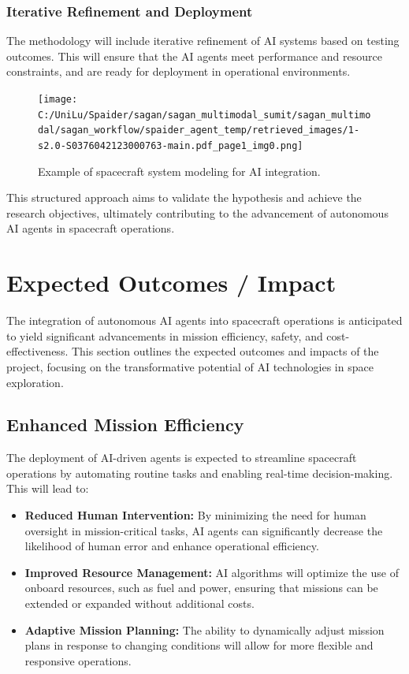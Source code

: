 \documentclass[a4paper, 11pt]{article}
\begin{document}
\subsubsection{Iterative Refinement and Deployment}

The methodology will include iterative refinement of AI systems based on testing outcomes. This will ensure that the AI agents meet performance and resource constraints, and are ready for deployment in operational environments.

\begin{figure}[htbp]
    \centering
    \texttt{[image: C:/UniLu/Spaider/sagan/sagan\_multimodal\_sumit/sagan\_multimodal/sagan\_workflow/spaider\_agent\_temp/retrieved\_images/1-s2.0-S0376042123000763-main.pdf\_page1\_img0.png]}
    \caption{Example of spacecraft system modeling for AI integration.}
    \label{fig:spacecraft-modeling}
\end{figure}

This structured approach aims to validate the hypothesis and achieve the research objectives, ultimately contributing to the advancement of autonomous AI agents in spacecraft operations.
\section{Expected Outcomes / Impact}

The integration of autonomous AI agents into spacecraft operations is anticipated to yield significant advancements in mission efficiency, safety, and cost-effectiveness. This section outlines the expected outcomes and impacts of the project, focusing on the transformative potential of AI technologies in space exploration.

\subsection{Enhanced Mission Efficiency}

The deployment of AI-driven agents is expected to streamline spacecraft operations by automating routine tasks and enabling real-time decision-making. This will lead to:

\begin{itemize}
    \item \textbf{Reduced Human Intervention:} By minimizing the need for human oversight in mission-critical tasks, AI agents can significantly decrease the likelihood of human error and enhance operational efficiency.
    \item \textbf{Improved Resource Management:} AI algorithms will optimize the use of onboard resources, such as fuel and power, ensuring that missions can be extended or expanded without additional costs.
    \item \textbf{Adaptive Mission Planning:} The ability to dynamically adjust mission plans in response to changing conditions will allow for more flexible and responsive operations.
\end{itemize}
\end{document}
